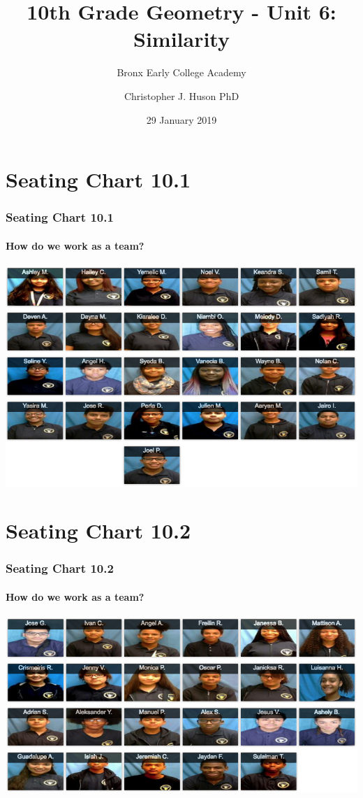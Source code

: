 \documentclass{beamer}
\title{10th Grade Geometry - Unit 6: Similarity}
\subtitle{Bronx Early College Academy}
\author{Christopher J. Huson PhD}
\date{29 January 2019}
\begin{document}
\frame{\titlepage}
\section[Outline]{}
\frame{\tableofcontents}


\section{Seating Chart 10.1}
  \frame
  {
    \frametitle{Seating Chart 10.1}
    \framesubtitle{How do we work as a team?}

    \includegraphics[width=1.0\textwidth]{seating-10A.png}
  }

\section{Seating Chart 10.2}
  \frame
  {
    \frametitle{Seating Chart 10.2}
    \framesubtitle{How do we work as a team?}

    \includegraphics[width=1.0\textwidth]{seating-10B.png}
  }
\end{document}

